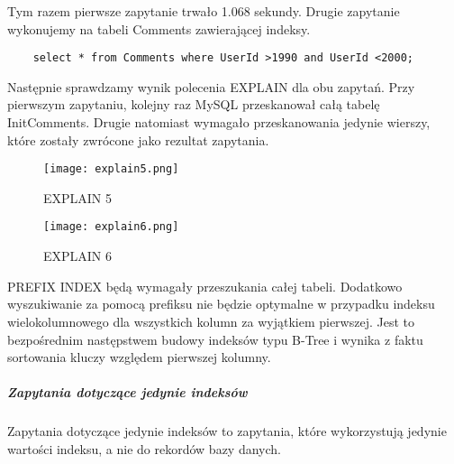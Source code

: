 Tym razem pierwsze zapytanie trwało 1.068 sekundy. Drugie zapytanie wykonujemy na tabeli Comments zawierającej indeksy.
\begin{verbatim}
    select * from Comments where UserId >1990 and UserId <2000;
\end{verbatim}
Następnie sprawdzamy wynik polecenia EXPLAIN dla obu zapytań. Przy pierwszym zapytaniu, kolejny raz MySQL przeskanował całą tabelę Init\textunderscore Comments. Drugie natomiast wymagało przeskanowania jedynie wierszy, które zostały zwrócone jako rezultat zapytania.

\begin{figure}[h]
    \texttt{[image: explain5.png]} 
    \caption{EXPLAIN 5}
\end{figure}

\begin{figure}[h]
    \texttt{[image: explain6.png]} 
    \caption{EXPLAIN 6}
\end{figure}


PREFIX INDEX
będą wymagały przeszukania całej tabeli. Dodatkowo wyszukiwanie za pomocą prefiksu nie będzie optymalne w przypadku indeksu wielokolumnowego dla wszystkich kolumn za wyjątkiem pierwszej. Jest to bezpośrednim następstwem budowy indeksów typu B-Tree i wynika z faktu sortowania kluczy względem pierwszej kolumny.





\subparagraph{Zapytania dotyczące jedynie indeksów}\mbox{}
Zapytania dotyczące jedynie indeksów to zapytania, które wykorzystują jedynie wartości indeksu, a nie do rekordów bazy danych.


\subparagraph{}


